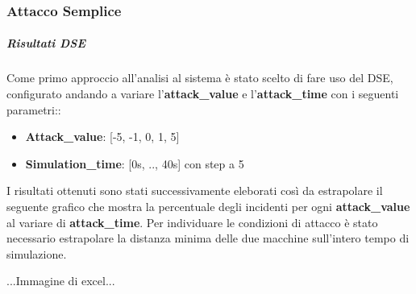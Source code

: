 \subsubsection{Attacco Semplice}
\subparagraph{Risultati DSE}
Come primo approccio all'analisi al sistema è stato scelto di fare uso del DSE, configurato andando a variare l'\textbf{attack\_value} e l'\textbf{attack\_time} con i seguenti parametri::
\begin{itemize}
	\item \textbf{Attack\_value}: [-5, -1, 0, 1, 5]
	\item \textbf{Simulation\_time}: [0s, .., 40s] con step a 5
\end{itemize}
I risultati ottenuti sono stati successivamente eleborati così da estrapolare il seguente grafico che mostra la percentuale degli incidenti per ogni \textbf{attack\_value} al variare di \textbf{attack\_time}. Per individuare le condizioni di attacco è stato necessario estrapolare la distanza minima delle due macchine sull'intero tempo di simulazione.

...Immagine di excel...

